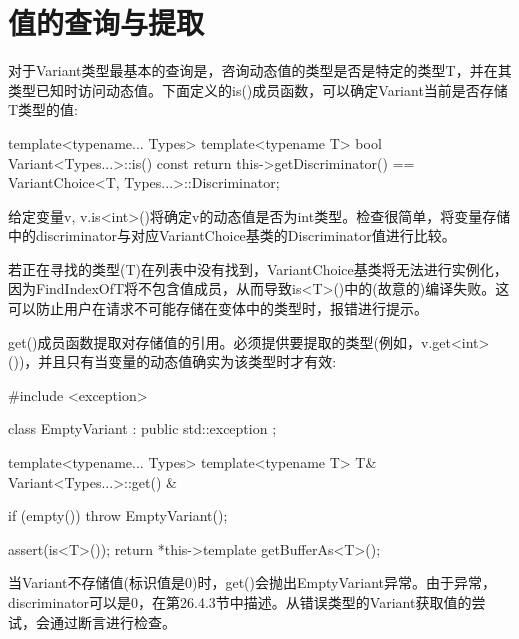 \section{值的查询与提取}
对于Variant类型最基本的查询是，咨询动态值的类型是否是特定的类型T，并在其类型已知时访问动态值。下面定义的is()成员函数，可以确定Variant当前是否存储T类型的值:

\begin{cpp}
template<typename... Types>
template<typename T>
bool Variant<Types...>::is() const
{
	return this->getDiscriminator() ==
	VariantChoice<T, Types...>::Discriminator;
}
\end{cpp}

给定变量v, v.is<int>()将确定v的动态值是否为int类型。检查很简单，将变量存储中的discriminator与对应VariantChoice基类的Discriminator值进行比较。

若正在寻找的类型(T)在列表中没有找到，VariantChoice基类将无法进行实例化，因为FindIndexOfT将不包含值成员，从而导致is<T>()中的(故意的)编译失败。这可以防止用户在请求不可能存储在变体中的类型时，报错进行提示。

get()成员函数提取对存储值的引用。必须提供要提取的类型(例如，v.get<int>())，并且只有当变量的动态值确实为该类型时才有效:

\begin{cpp}
#include <exception>

class EmptyVariant : public std::exception {
};

template<typename... Types>
template<typename T>
T& Variant<Types...>::get() & {
	if (empty()) {
		throw EmptyVariant();
	}

	assert(is<T>());
	return *this->template getBufferAs<T>();
}
\end{cpp}

当Variant不存储值(标识值是0)时，get()会抛出EmptyVariant异常。由于异常，discriminator可以是0，在第26.4.3节中描述。从错误类型的Variant获取值的尝试，会通过断言进行检查。













































